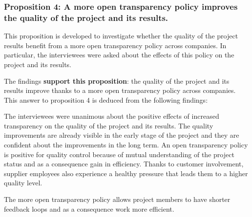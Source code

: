 \vspace{.2cm}
\subsubsection{Proposition 4: A more open transparency policy improves the quality of the project and its results.}


This proposition is developed to investigate whether the quality of the project results benefit from a more open transparency policy across companies. In particular, the interviewees were asked about the effects of this policy on the project and its results.

The findings {\bf support this proposition}:  the quality of the project and its results improve thanks to a more open transparency policy across companies. This answer to proposition 4 is deduced from the following findings:

 The interviewees were unanimous about the positive effects of increased transparency on the quality of the project and its results. The quality improvements are already visible in the early stage of the project and they are confident about the improvements in the long term. An open transparency policy is positive for quality control because of mutual understanding of the project status and as a consequence gain in efficiency. Thanks to customer involvement, supplier employees also experience a healthy pressure that leads them to a higher quality level.

 The more open transparency policy allows project members to have shorter feedback loops and as a consequence work more efficient.

